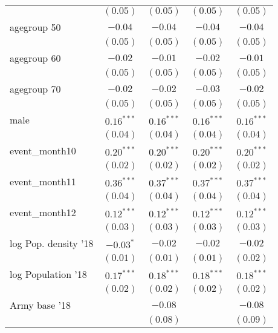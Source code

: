 \begin{table}
\begin{center}
\begin{tabular}{l c c c c}
                     & $(0.05)$      & $(0.05)$      & $(0.05)$      & $(0.05)$      \\
agegroup 50          & $-0.04$       & $-0.04$       & $-0.04$       & $-0.04$       \\
                     & $(0.05)$      & $(0.05)$      & $(0.05)$      & $(0.05)$      \\
agegroup 60          & $-0.02$       & $-0.01$       & $-0.02$       & $-0.01$       \\
                     & $(0.05)$      & $(0.05)$      & $(0.05)$      & $(0.05)$      \\
agegroup 70          & $-0.02$       & $-0.02$       & $-0.03$       & $-0.02$       \\
                     & $(0.05)$      & $(0.05)$      & $(0.05)$      & $(0.05)$      \\
male                 & $0.16^{***}$  & $0.16^{***}$  & $0.16^{***}$  & $0.16^{***}$  \\
                     & $(0.04)$      & $(0.04)$      & $(0.04)$      & $(0.04)$      \\
event\_month10       & $0.20^{***}$  & $0.20^{***}$  & $0.20^{***}$  & $0.20^{***}$  \\
                     & $(0.02)$      & $(0.02)$      & $(0.02)$      & $(0.02)$      \\
event\_month11       & $0.36^{***}$  & $0.37^{***}$  & $0.37^{***}$  & $0.37^{***}$  \\
                     & $(0.04)$      & $(0.04)$      & $(0.04)$      & $(0.04)$      \\
event\_month12       & $0.12^{***}$  & $0.12^{***}$  & $0.12^{***}$  & $0.12^{***}$  \\
                     & $(0.03)$      & $(0.03)$      & $(0.03)$      & $(0.03)$      \\
log Pop. density '18 & $-0.03^{*}$   & $-0.02$       & $-0.02$       & $-0.02$       \\
                     & $(0.01)$      & $(0.01)$      & $(0.01)$      & $(0.02)$      \\
log Population '18   & $0.17^{***}$  & $0.18^{***}$  & $0.18^{***}$  & $0.18^{***}$  \\
                     & $(0.02)$      & $(0.02)$      & $(0.02)$      & $(0.02)$      \\
Army base '18        &               & $-0.08$       &               & $-0.08$       \\
                     &               & $(0.08)$      &               & $(0.09)$      \\

\end{tabular}
\end{center}
\end{table}
